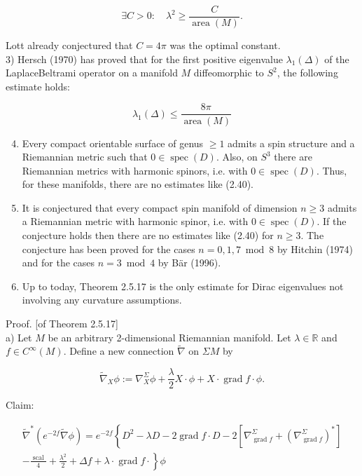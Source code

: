 \documentclass[10pt, letterpaper]{article}
\begin{document}
$$
\exists C>0: \quad \lambda^{2} \geq \frac{C}{\operatorname{area}(M)} .
$$

Lott already conjectured that $C=4 \pi$ was the optimal constant.\\
3) Hersch (1970) has proved that for the first positive eigenvalue $\lambda_{1}(\Delta)$ of the LaplaceBeltrami operator on a manifold $M$ diffeomorphic to $S^{2}$, the following estimate holds:

$$
\lambda_{1}(\Delta) \leq \frac{8 \pi}{\operatorname{area}(M)}
$$

\begin{enumerate}
  \setcounter{enumi}{3}
  \item Every compact orientable surface of genus $\geq 1$ admits a spin structure and a Riemannian metric such that $0 \in \operatorname{spec}(D)$. Also, on $S^{3}$ there are Riemannian metrics with harmonic spinors, i.e. with $0 \in \operatorname{spec}(D)$. Thus, for these manifolds, there are no estimates like (2.40).
  \item It is conjectured that every compact spin manifold of dimension $n \geq 3$ admits a Riemannian metric with harmonic spinor, i.e. with $0 \in \operatorname{spec}(D)$. If the conjecture holds then there are no estimates like (2.40) for $n \geq 3$. The conjecture has been proved for the cases $n=0,1,7 \bmod 8$ by Hitchin (1974) and for the cases $n=3 \bmod 4$ by Bär (1996).
  \item Up to today, Theorem 2.5.17 is the only estimate for Dirac eigenvalues not involving any curvature assumptions.
\end{enumerate}

Proof. [of Theorem 2.5.17]\\
a) Let $M$ be an arbitrary 2-dimensional Riemannian manifold. Let $\lambda \in \mathbb{R}$ and $f \in C^{\infty}(M)$. Define a new connection $\tilde{\nabla}$ on $\Sigma M$ by

$$
\widetilde{\nabla}_{X} \phi:=\nabla_{X}^{\Sigma} \phi+\frac{\lambda}{2} X \cdot \phi+X \cdot \operatorname{grad} f \cdot \phi .
$$

Claim:

$$
\begin{gathered}
\tilde{\nabla}^{*}\left(e^{-2 f} \tilde{\nabla} \phi\right)=e^{-2 f}\left\{D^{2}-\lambda D-2 \operatorname{grad} f \cdot D-2\left[\nabla_{\operatorname{grad} f}^{\Sigma}+\left(\nabla_{\operatorname{grad} f}^{\Sigma}\right)^{*}\right]\right. \\
\left.-\frac{\text { scal }}{4}+\frac{\lambda^{2}}{2}+\Delta f+\lambda \cdot \operatorname{grad} f \cdot\right\} \phi
\end{gathered}
$$
\end{document}
